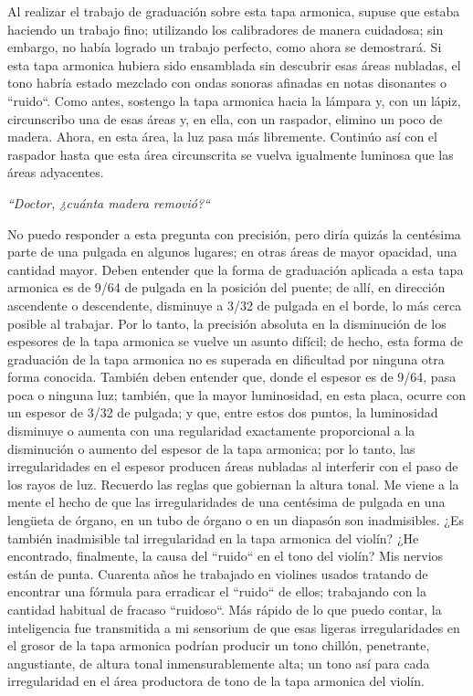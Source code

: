 \documentclass[12pt]{book}
\begin{document}
Al realizar el trabajo de graduación sobre esta tapa armonica, supuse que estaba haciendo un trabajo fino; utilizando los calibradores de manera cuidadosa; sin embargo, no había logrado un trabajo perfecto, como ahora se demostrará. Si esta tapa armonica hubiera sido ensamblada sin descubrir esas áreas nubladas, el tono habría estado mezclado con ondas sonoras afinadas en notas disonantes o ``ruido``. Como antes, sostengo la tapa armonica hacia la lámpara y, con un lápiz, circunscribo una de esas áreas y, en ella, con un raspador, elimino un poco de madera. Ahora, en esta área, la luz pasa más libremente. Continúo así con el raspador hasta que esta área circunscrita se vuelva igualmente luminosa que las áreas adyacentes.

\textit{``Doctor, ¿cuánta madera removió?``}

No puedo responder a esta pregunta con precisión, pero diría quizás la centésima parte de una pulgada en algunos lugares; en otras áreas de mayor opacidad, una cantidad mayor. Deben entender que la forma de graduación aplicada a esta tapa armonica es de 9/64 de pulgada en la posición del puente; de allí, en dirección ascendente o descendente, disminuye a 3/32 de pulgada en el borde, lo más cerca posible al trabajar. Por lo tanto, la precisión absoluta en la disminución de los espesores de la tapa armonica se vuelve un asunto difícil; de hecho, esta forma de graduación de la tapa armonica no es superada en dificultad por ninguna otra forma conocida. También deben entender que, donde el espesor es de 9/64, pasa poca o ninguna luz; también, que la mayor luminosidad, en esta placa, ocurre con un espesor de 3/32 de pulgada; y que, entre estos dos puntos, la luminosidad disminuye o aumenta con una regularidad exactamente proporcional a la disminución o aumento del espesor de la tapa armonica; por lo tanto, las irregularidades en el espesor producen áreas nubladas al interferir con el paso de los rayos de luz. Recuerdo las reglas que gobiernan la altura tonal. Me viene a la mente el hecho de que las irregularidades de una centésima de pulgada en una lengüeta de órgano, en un tubo de órgano o en un diapasón son inadmisibles. ¿Es también inadmisible tal irregularidad en la tapa armonica del violín? ¿He encontrado, finalmente, la causa del ``ruido`` en el tono del violín? Mis nervios están de punta. Cuarenta años he trabajado en violines usados tratando de encontrar una fórmula para erradicar el ``ruido`` de ellos; trabajando con la cantidad habitual de fracaso ``ruidoso``. Más rápido de lo que puedo contar, la inteligencia fue transmitida a mi sensorium de que esas ligeras irregularidades en el grosor de la tapa armonica podrían producir un tono chillón, penetrante, angustiante, de altura tonal inmensurablemente alta; un tono así para cada irregularidad en el área productora de tono de la tapa armonica del violín.
\end{document}
